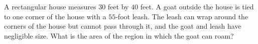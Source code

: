 A rectangular house measures $30$ feet by $40$ feet. A goat outside the house is tied to one corner of the house with a $55$-foot leash. The leash can wrap around the corners of the house but cannot pass through it, and the goat and leash have negligible size. What is the area of the region in which the goat can roam?
